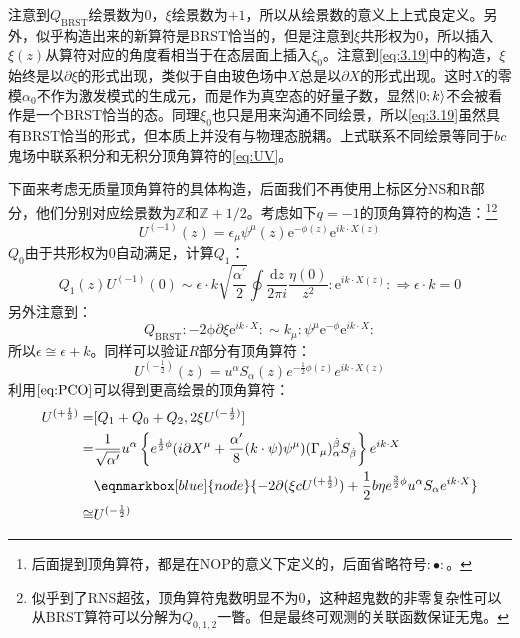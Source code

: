 注意到$Q_{\mathrm{BRST}}$绘景数为$0$，$\xi$绘景数为$+1$，所以从绘景数的意义上上式良定义。另外，似乎构造出来的新算符是BRST恰当的，但是注意到$\xi$共形权为$0$，所以插入$\xi(z)$从算符对应的角度看相当于在态层面上插入$\xi_0$。注意到\ref{eq:3.19}中的构造，$\xi$始终是以$\partial\xi$的形式出现，类似于自由玻色场中$X$总是以$\partial X$的形式出现。这时$X$的零模$\alpha_0$不作为激发模式的生成元，而是作为真空态的好量子数，显然$\ket{0;k}$不会被看作是一个BRST恰当的态。同理$\xi_0$也只是用来沟通不同绘景，所以\ref{eq:3.19}虽然具有BRST恰当的形式，但本质上并没有与物理态脱耦。上式联系不同绘景等同于$bc$鬼场中联系积分和无积分顶角算符的\ref{eq:UV}。

下面来考虑无质量顶角算符的具体构造，后面我们不再使用上标区分NS和R部分，他们分别对应绘景数为$\mathbb{Z}$和$\mathbb{Z}+1/2$。考虑如下$q=-1$的顶角算符的构造：\footnote{后面提到顶角算符，都是在NOP的意义下定义的，后面省略符号$:\bullet:$。}\footnote{似乎到了RNS超弦，顶角算符鬼数明显不为$0$，这种超鬼数的非零复杂性可以从BRST算符可以分解为$Q_{0,1,2}$一瞥。但是最终可观测的关联函数保证无鬼。}
\begin{equation}
	\label{eq:3.30}
	U^{(-1)}(z)=\epsilon_\mu\psi^\mu(z)\mathrm{e}^{-\phi(z)}\mathrm{e}^{ik\cdot X(z)}
\end{equation}
$Q_0$由于共形权为$0$自动满足，计算$Q_1$：
\begin{equation}
	Q_1(z)U^{(-1)}(0)\sim \epsilon\cdot k\sqrt{\frac{\alpha^\prime}{2}}\oint \frac{\mathrm{d}z}{2\pi i}\frac{\eta(0)}{z^2}:\mathrm{e}^{ik\cdot X(z)}:\Rightarrow \epsilon\cdot k = 0
\end{equation}
另外注意到：
\begin{equation}
	Q_{\mathrm{BRST}}:\mathrm{-2\phi}\partial \xi\mathrm{e}^{ik\cdot X}:\sim k_\mu:\psi^\mu\mathrm{e}^{-\phi}\mathrm{e}^{ik\cdot X}:
\end{equation}
所以$\epsilon\cong\epsilon+k$。同样可以验证$R$部分有顶角算符：
\begin{equation}
	\label{eq:3.33}
	U^{(-\frac{1}{2})}(z)=u^\alpha S_\alpha(z)e^{-\frac{1}{2}\phi(z)}e^{ik\cdot X(z)}
\end{equation}
利用$\ref{eq:PCO}$可以得到更高绘景的顶角算符：
\begin{equation}
	\label{eq:3.34}
	\begin{aligned}
		U^{(+\frac{1}{2})}
		=&[Q_1+Q_0+Q_2,2\xi U^{(-\frac{1}{2})}]\\
		=&\frac{1}{\sqrt{\alpha^{\prime}}}u^\alpha\left\{e^{\frac{1}{2}\phi}(i\partial X^\mu+\frac{\alpha^{\prime}}{8}(k\cdot\psi)\psi^\mu)(\Gamma_\mu)_\alpha^{\dot{\beta}}S_{\dot\beta}\right\}e^{ik\cdot X}\\
		&\eqnmarkbox[blue]{node}{-2\partial(\xi cU^{(+\frac{1}{2})})+\frac{1}{2}b\eta e^{\frac{3}{2}\phi}u^\alpha S_\alpha e^{ik\cdot X}}\\
		\cong& U^{(-\frac12)}
	\end{aligned}
\end{equation}

